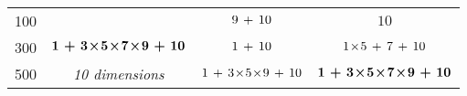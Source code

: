 \begin{table} [!ht]
\begin{center}
{\begin{tabular}{c   c |  c | c  }
												
100		&		 		&		 ${9 \, + \, 10}$ 		&		${10} $ \\
300		&		$\bm{ {1} \, + \, {3\! \times \! 5\! \times \! 7\! \times \! 9}  \, + \, {10} }$  		&		 ${1} \, + \, {10}$  		&		${1 \! \times \! 5 \, + \, 7 \, + \, 10}$ \\
500		&		\emph{10 dimensions} 		&		 ${1} \, + \, {3\! \times \!5\! \times \!9} \, + \, {10}$  		&		 $\bm{{1} \, + \, {3\! \times \!5\! \times \!7\! \times \!9} \, + \, {10}}$  

\end{tabular}
}     

 \end{center}





\end{table}

